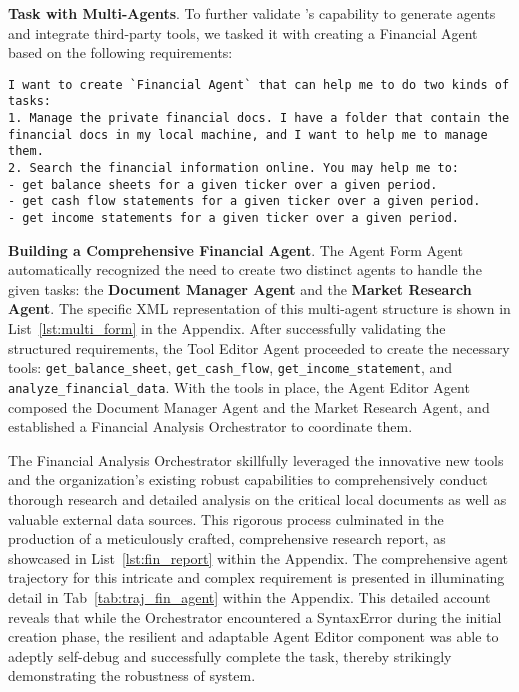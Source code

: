 \noindent \textbf{Task with Multi-Agents}. To further validate \model's capability to generate agents and integrate third-party tools, we tasked it with creating a Financial Agent based on the following requirements:
\begin{lstlisting}[basicstyle=\ttfamily\footnotesize, frame=none, columns=fullflexible, breaklines=true, breakatwhitespace=true, breakindent=3pt]
I want to create `Financial Agent` that can help me to do two kinds of tasks:
1. Manage the private financial docs. I have a folder that contain the financial docs in my local machine, and I want to help me to manage them.
2. Search the financial information online. You may help me to: 
- get balance sheets for a given ticker over a given period.
- get cash flow statements for a given ticker over a given period.
- get income statements for a given ticker over a given period.
\end{lstlisting}

\noindent \textbf{Building a Comprehensive Financial Agent}. The Agent Form Agent automatically recognized the need to create two distinct agents to handle the given tasks: the \textbf{Document Manager Agent} and the \textbf{Market Research Agent}. The specific XML representation of this multi-agent structure is shown in List~\ref{lst:multi_form} in the Appendix. After successfully validating the structured requirements, the Tool Editor Agent proceeded to create the necessary tools: \texttt{get\_balance\_sheet}, \texttt{get\_cash\_flow}, \texttt{get\_income\_statement}, and \texttt{analyze\_financial\_data}. With the tools in place, the Agent Editor Agent composed the Document Manager Agent and the Market Research Agent, and established a Financial Analysis Orchestrator to coordinate them.

The Financial Analysis Orchestrator skillfully leveraged the innovative new tools and the organization's existing robust capabilities to comprehensively conduct thorough research and detailed analysis on the critical local documents as well as valuable external data sources. This rigorous process culminated in the production of a meticulously crafted, comprehensive research report, as showcased in List~\ref{lst:fin_report} within the Appendix. The comprehensive agent trajectory for this intricate and complex requirement is presented in illuminating detail in Tab~\ref{tab:traj_fin_agent} within the Appendix. This detailed account reveals that while the Orchestrator encountered a SyntaxError during the initial creation phase, the resilient and adaptable Agent Editor component was able to adeptly self-debug and successfully complete the task, thereby strikingly demonstrating the robustness of \model system.

